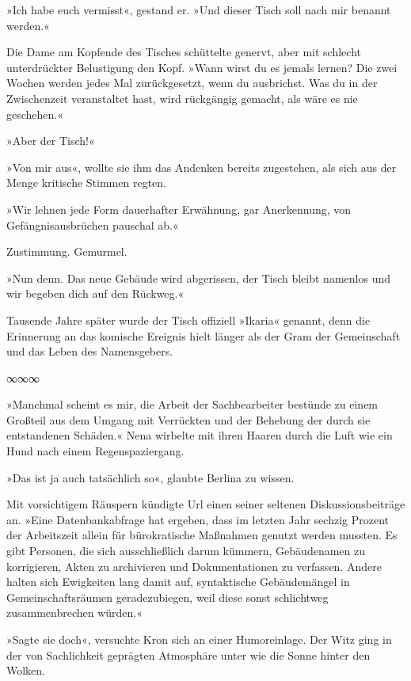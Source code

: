 »Ich habe euch vermisst«, gestand er. »Und dieser Tisch soll nach mir benannt werden.«

Die Dame am Kopfende des Tisches schüttelte genervt, aber mit schlecht unterdrückter Belustigung den Kopf. »Wann wirst du es jemals lernen? Die zwei Wochen werden jedes Mal zurückgesetzt, wenn du ausbrichst. Was du in der Zwischenzeit veranstaltet hast, wird rückgängig gemacht, als wäre es nie geschehen.«

»Aber der Tisch!«

»Von mir aus«, wollte sie ihm das Andenken bereits zugestehen, als sich aus der Menge kritische Stimmen regten.

»Wir lehnen jede Form dauerhafter Erwähnung, gar Anerkennung, von Gefängnisausbrüchen pauschal ab.«

Zustimmung. Gemurmel.

»Nun denn. Das neue Gebäude wird abgerissen, der Tisch bleibt namenlos und wir begeben dich auf den Rückweg.«

Tausende Jahre später wurde der Tisch offiziell »Ikaria« genannt, denn die Erinnerung an das komische Ereignis hielt länger als der Gram der Gemeinschaft und das Leben des Namensgebers.

\begin{center}
	∞∞∞
\end{center}

»Manchmal scheint es mir, die Arbeit der Sachbearbeiter bestünde zu einem Großteil aus dem Umgang mit Verrückten und der Behebung der durch sie entstandenen Schäden.« Nena wirbelte mit ihren Haaren durch die Luft wie ein Hund nach einem Regenspaziergang.

»Das ist ja auch tatsächlich so«, glaubte Berlina zu wissen.

Mit vorsichtigem Räuspern kündigte Url einen seiner seltenen Diskussionsbeiträge an. »Eine Datenbankabfrage hat ergeben, dass im letzten Jahr sechzig Prozent der Arbeitszeit allein für bürokratische Maßnahmen genutzt werden mussten. Es gibt Personen, die sich ausschließlich darum kümmern, Gebäudenamen zu korrigieren, Akten zu archivieren und Dokumentationen zu verfassen. Andere halten sich Ewigkeiten lang damit auf, syntaktische Gebäudemängel in Gemeinschaftsräumen geradezubiegen, weil diese sonst schlichtweg zusammenbrechen würden.«

»Sagte sie doch«, versuchte Kron sich an einer Humoreinlage. Der Witz ging in der von Sachlichkeit geprägten Atmosphäre unter wie die Sonne hinter den Wolken.

